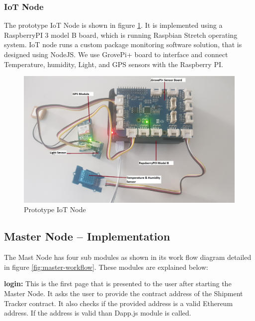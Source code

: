 \subsubsection{IoT Node}
The prototype IoT Node is shown in figure \ref{fig:piIoT}. It is implemented using a RaspberryPI 3 model B board, which is running Raspbian Stretch operating system. IoT node runs a custom package monitoring software solution, that is designed using NodeJS. We use GrovePi+ board to interface and connect Temperature, humidity, Light, and GPS sensors with the Raspberry PI.

\begin{figure}[h]
	\centering
    \includegraphics[width=140mm,scale=1]{figs/piIoT}
	\caption{Prototype IoT Node}
	\label{fig:piIoT} 
\end{figure}
\clearpage


\subsection{Master Node – Implementation} \label{IMN} 
The Mast Node has four sub modules as shown in its work flow diagram detailed in figure \ref{fig:master-workflow}. These modules are explained below:

\textbf{login:}
This is the first page that is presented to the user after starting the Master Node. It asks the user to provide the contract address of the Shipment Tracker contract. It also checks if the provided address is a valid Ethereum address. If the address is valid than Dapp.js module is called.

